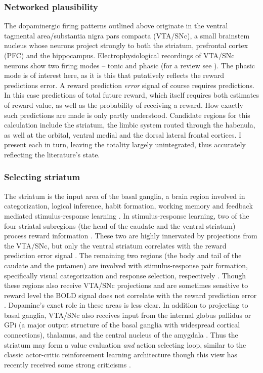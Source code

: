 \documentclass[doc,12pt]{apa}        %
\begin{document}
\subsubsection{Networked plausibility}
\label{subsub:plausibility}
The dopaminergic firing patterns outlined above originate in the ventral tagmental area/substantia nigra pars compacta (VTA/SNc), a small brainstem nucleus whose neurons project strongly to both the striatum, prefrontal cortex (PFC) and the hippocampus.  Electrophysiological recordings of VTA/SNc neurons show two firing modes -- tonic and phasic (for a review see ).  The phasic mode is of interest here, as it is this that putatively reflects the reward predictions error. A reward prediction \emph{error} signal of course requires predictions.  In this case predictions of total future reward, which itself requires both estimates of reward value, as well as the probability of receiving a reward.  How exactly such predictions are made is only partly understood.  Candidate regions for this calculation include the striatum, the limbic system routed through the habenula, as well at the orbital, ventral medial and the dorsal lateral frontal cortices.  I present each in turn, leaving the totality largely unintegrated, thus accurately reflecting the literature's state.

\subsubsection{Selecting striatum}
\label{subsub:selstr}
The striatum is the input area of the basal ganglia, a brain region involved in categorization, logical inference, habit formation, working memory and feedback mediated stimulus-response learning \cite{Frank:2001p1996,Jin:2010p7199,SchmitzerTorbert:2004p5410,Seger:2008p6401,Seger:2010p7189,Yin:2006p5080}.  In stimulus-response learning, two of the four striatal subregions (the head of the caudate and the ventral striatum) process reward information \cite{Yin:2005p5101,Yin:2008p6347,Schonberg:2009p6669}.  These two are highly innervated by projections from the VTA/SNc, but only the ventral striatum correlates with the reward prediction error signal \cite{Haruno:2006p3979,Seger:2010p7189}.  The remaining two regions (the body and tail of the caudate and the putamen) are involved with stimulus-response pair formation, specifically visual categorization and response selection, respectively \cite{Seger:2008p6401,Seger:2010p7189}.  Though these regions also receive VTA/SNc projections and are sometimes sensitive to reward level \cite{BischoffGrethe:2009p4570} the BOLD signal does not correlate with the reward prediction error \cite{Seger:2010p7189}.  Dopamine's exact role in these areas is less clear.  In addition to projecting to basal ganglia, VTA/SNc also receives input from the internal globus pallidus or GPi (a major output structure of the basal ganglia with widespread cortical connections), thalamus, and the central nucleus of the amygdala \cite{Botvinick:2008p6594}.   Thus the striatum may form a value evaluation \emph{and} action selecting loop, similar to the classic actor-critic reinforcement learning architecture \cite{Bornstein:2011p7996,Ito:2011p8146} though this view has recently received some strong criticisms \cite{Joel:2002p6593}.
\end{document}

